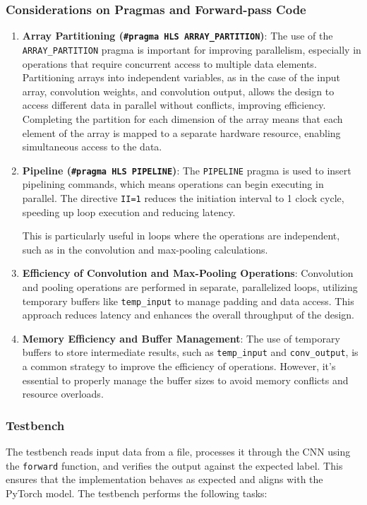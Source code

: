 \documentclass{article}
\begin{document}
\subsubsection{Considerations on Pragmas and Forward-pass Code}

\begin{enumerate}
    \item \textbf{Array Partitioning (\texttt{\#pragma HLS ARRAY\_PARTITION})}:  
    The use of the \texttt{ARRAY\_PARTITION} pragma is important for improving parallelism, especially in operations that require concurrent access to multiple data elements. Partitioning arrays into independent variables, as in the case of the input array, convolution weights, and convolution output, allows the design to access different data in parallel without conflicts, improving efficiency. Completing the partition for each dimension of the array means that each element of the array is mapped to a separate hardware resource, enabling simultaneous access to the data.

    \item \textbf{Pipeline (\texttt{\#pragma HLS PIPELINE})}:  
    The \texttt{PIPELINE} pragma is used to insert pipelining commands, which means operations can begin executing in parallel. The directive \texttt{II=1} reduces the initiation interval to 1 clock cycle, speeding up loop execution and reducing latency.

    This is particularly useful in loops where the operations are independent, such as in the convolution and max-pooling calculations.

    \item \textbf{Efficiency of Convolution and Max-Pooling Operations}:  
    Convolution and pooling operations are performed in separate, parallelized loops, utilizing temporary buffers like \texttt{temp\_input} to manage padding and data access. This approach reduces latency and enhances the overall throughput of the design.

    \item \textbf{Memory Efficiency and Buffer Management}:  
    The use of temporary buffers to store intermediate results, such as \texttt{temp\_input} and \texttt{conv\_output}, is a common strategy to improve the efficiency of operations. However, it's essential to properly manage the buffer sizes to avoid memory conflicts and resource overloads.
\end{enumerate}

\subsubsection{Testbench}
The testbench reads input data from a file, processes it through the CNN using the \texttt{forward} function, and verifies the output against the expected label. This ensures that the implementation behaves as expected and aligns with the PyTorch model. The testbench performs the following tasks:
\end{document}
